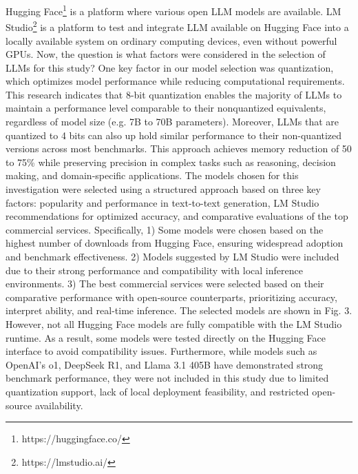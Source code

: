 \documentclass[conference]{IEEEtran}
\begin{document}
Hugging Face\footnote{https://huggingface.co/} is a platform where various open LLM models are available. LM Studio\footnote{https://lmstudio.ai/} is a platform to test and integrate LLM available on Hugging Face into a locally available system on ordinary computing devices, even without powerful GPUs. Now, the question is what factors were considered in the selection of LLMs for this study? One key factor in our model selection was quantization, which optimizes model performance while reducing computational requirements. This research \cite{xiao2023smoothquant} indicates that 8-bit quantization enables the majority of LLMs to maintain a performance level comparable to their nonquantized equivalents, regardless of model size (e.g. 7B to 70B parameters). Moreover, LLMs that are quantized to 4 bits can also up hold similar performance to their non-quantized versions across most benchmarks. This approach achieves memory reduction of 50 to 75\% while preserving precision in complex tasks such as reasoning, decision making, and domain-specific applications. 
The models chosen for this investigation were selected using a structured approach based on three key factors: popularity and performance in text-to-text generation, LM Studio recommendations for optimized accuracy, and comparative evaluations of the top commercial services. Specifically, 1) Some models were chosen based on the highest number of downloads from Hugging Face, ensuring widespread adoption and benchmark effectiveness. 2) Models suggested by LM Studio were included due to their strong performance and compatibility with local inference environments. 3) The best commercial services were selected based on their comparative performance with open-source counterparts, prioritizing accuracy, interpret ability, and real-time inference. The selected models are shown in Fig. 3. However, not all Hugging Face models are fully compatible with the LM Studio runtime. As a result, some models were tested directly on the Hugging Face interface to avoid compatibility issues. Furthermore, while models such as OpenAI’s o1, DeepSeek R1, and Llama 3.1 405B have demonstrated strong benchmark performance, they were not included in this study due to limited quantization support, lack of local deployment feasibility, and restricted open-source availability.

\end{document}
